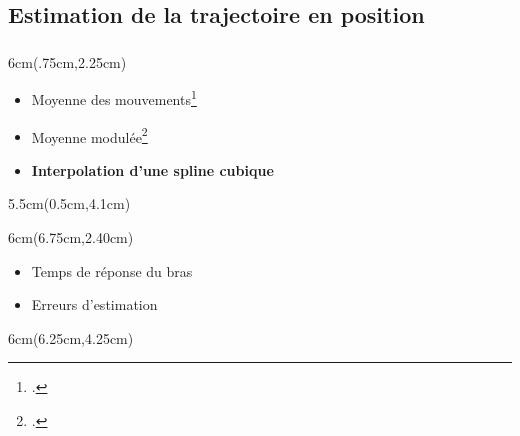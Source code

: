 \documentclass[10pt,xcolor=table]{beamer}
\begin{document}
\subsection{Estimation de la trajectoire en position}
\begin{frame}
	\frametitle{\insertsubsection}
	\begin{textblock*}{6cm}(.75cm,2.25cm)
		\begin{itemize}[<+->]
			\item Moyenne des mouvements\footcite{bennett_time-varying_1992}
			\item Moyenne modulée\footcite{burdet_method_2000}
			\item \textcolor<3>{Prune}{\textbf<3>{Interpolation d'une spline cubique}}
		\end{itemize}
	\end{textblock*}
	\begin{textblock*}{5.5cm}(0.5cm,4.1cm)
		\visible<4->{
			
		}
	\end{textblock*}
	\begin{textblock*}{6cm}(6.75cm,2.40cm)
		\begin{itemize}
			\item<6-> Temps de réponse du bras
			\item<7-> Erreurs d'estimation
		\end{itemize}
	\end{textblock*}
	\begin{textblock*}{6cm}(6.25cm,4.25cm)
		\visible<7->{
			
		}
	\end{textblock*}
\end{frame}


\end{document}
